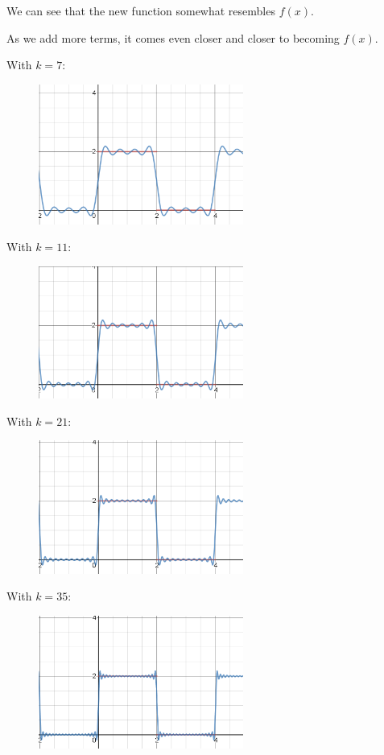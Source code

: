 \documentclass[a4paper]{article}
\begin{document}
	We can see that the new function somewhat resembles $f(x)$.
	
	As we add more terms, it comes even closer and closer to becoming $f(x)$.
	
	With $k = 7$:
	\begin{figure}[H]
		\centering
		\includegraphics[width=0.6\textwidth]{k=7.png}
	\end{figure}
	
	With $k = 11$:
	\begin{figure}[H]
		\centering
		\includegraphics[width=0.6\textwidth]{k=11.png}
	\end{figure}
	\newpage
	With $k = 21$:
	\begin{figure}[H]
		\centering
		\includegraphics[width=0.6\textwidth]{k=21.png}
	\end{figure}
	
	With $k = 35$:
	\begin{figure}[H]
		\centering
		\includegraphics[width=0.6\textwidth]{k=35.png}
	\end{figure}
	
\end{document}

